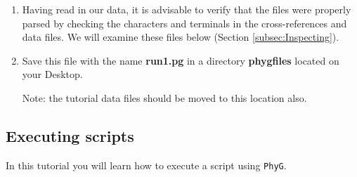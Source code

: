 \documentclass[]{article}
\begin{document}
\begin{enumerate}
\item Having read in our data, it is advisable to verify that the files were properly 
parsed by checking the characters and terminals in the cross-references and data 
files. We will examine these files below (Section \ref{subsec:Inspecting}).

\item Save this file with the name \textbf{run1.pg} in a directory \textbf{phygfiles} 
located on your Desktop. 

Note: the tutorial data files should be moved to this 
location also.

\end{enumerate}

\subsection{Executing scripts}
\label{subsec:executing}

In this tutorial you will learn how to execute a script using \texttt{PhyG}. 
\end{document}
